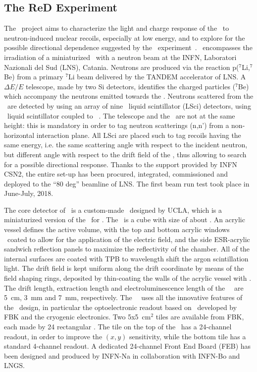 \subsection{The R\lowercase{e}D Experiment}
\label{sec:Red}

The \ReD\ project aims to characterize the light and charge response of the \LArTPC\ to neutron-induced nuclear recoils, especially at low energy, and to explore for the possible directional dependence suggested by the \SCENE\  experiment~\cite{Alexander:2013ke,Cao:2015ks}. \ReD\ encompasses the irradiation of a miniaturized \LArTPC\ with a neutron beam at the INFN, Laboratori Nazionali del Sud (LNS), Catania. Neutrons are produced via the reaction p($^{7}$Li,$^7$Be) from a primary $^{7}$Li beam delivered by the TANDEM accelerator of LNS.  A $\Delta E/E$ telescope, made by two Si detectors, identifies the charged particles ($^{7}$Be) which accompany the neutrons emitted towards the \TPC. Neutrons scattered from the \TPC\ are detected by using an array of nine \RedLNSNeutronSpectrometerDetectorsPMTsDiameter\ liquid scintillator (LSci) detectors,  using \RedLNSNeutronSpectrometerDetectorsScintillatorType\ liquid scintillator coupled to \RedLNSNeutronSpectrometerDetectorsPMTsType\ \PMTs.  The  telescope and the \TPC\ are not at the same height: this is mandatory in order to tag neutron scatterings (n,n') from a non-horizontal interaction plane. All LSci are placed such to tag recoils having the same energy, i.e. the same scattering angle with respect to the incident neutron, but different angle with respect to the drift field of the \LArTPC, thus allowing to search for a possible directional response. Thanks to the support provided by INFN CSN2, the entire set-up has been procured, integrated, commissioned and deployed to the ``80 deg'' beamline of LNS. The first beam run test took place in June-July, 2018. 

The core detector of \ReD\ is a custom-made \TPC\ designed by UCLA, which is a miniaturized version of the \LArTPC\ for \DSks.  The \TPC\ is a cube with size of about \GAPTPCActiveDiameter.  An acrylic vessel defines the active volume, with the top and bottom acrylic windows \ITO\ coated to allow for the application of the electric field, and the side ESR-acrylic sandwich reflection panels to maximize the reflectivity of the chamber. All of the internal surfaces are coated with TPB to wavelength shift the argon scintillation light. The drift field is kept uniform along the drift coordinate by means of the field shaping rings, deposited by thin-coating the walls of the acrylic vessel with \ITO. The drift length, extraction length and electroluminescence length of the \ReD\ \TPC\ are 5~cm, 3~mm and 7~mm, respectively. The \ReD\ \TPC\ uses all the innovative features of the \DSks\ design, in particular the optoelectronic readout based on \SiPM\ developed by FBK and the cryogenic electronics. Two 5x5~cm$^2$ tiles are available from FBK, each made by 24 rectangular \SiPMs.  The tile on the top of the \LArTPC\ has a 24-channel readout, in order to improve the $(x,y)$ sensitivity, while the bottom tile has a standard 4-channel readout.  A dedicated 24-channel Front End Board (FEB) has been designed and produced by INFN-Na in collaboration with INFN-Bo and LNGS. 

